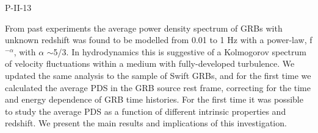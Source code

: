 P-II-13


\bigskip



\bigskip

\noindent From past experiments the average power density spectrum of GRBs with unknown redshift was found to be modelled from 0.01 to 1 Hz with a power-law, f$^{-\alpha}$, with $\alpha$ $\sim$5/3. In hydrodynamics this is suggestive of a Kolmogorov spectrum of velocity fluctuations within a medium with
fully-developed turbulence. We updated the same analysis to the sample of Swift GRBs, and for the first time we calculated the average PDS in the GRB source rest frame, correcting for the time and energy dependence of GRB time histories.
For the first time it was possible to study the average PDS as a function of different intrinsic properties and redshift.
We present the main results and implications of this investigation.

